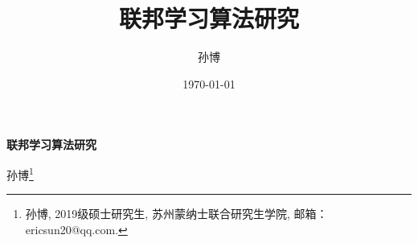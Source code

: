 \documentclass[a4paper]{article}
\title{联邦学习算法研究}
\author{孙博}
\date{\today}
\begin{document}

\maketitle
\tableofcontents 

\newpage
\centerline{\huge \bf 联邦学习算法研究}
\vspace{5mm}
\centerline{%
孙博\footnote{孙博, 2019级硕士研究生, 苏州蒙纳士联合研究生学院, 邮箱：ericsun20@qq.com.} 
}
\vspace{5mm}
 

% 
% 
% 

% 

% 
% 
% 
% 

% 
% 
% 





	

\end{document}
